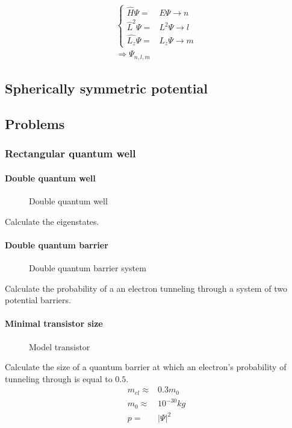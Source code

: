 	\begin{align}
		\left\{ \begin{aligned}
			\hat{H} \Psi =& E \Psi \rightarrow n\\
			\hat{L}^2 \Psi =& L^2 \Psi \rightarrow l \\
			\hat{L_z} \Psi =& L_z \Psi  \rightarrow m
		\end{aligned} \right. \\
		\Rightarrow \Psi_{n,l,m}
	\end{align}
	\subsection{Spherically symmetric potential}
	\newpage
	\subsection{Problems}
		\subsubsection{Rectangular quantum well}
			\paragraph{Double quantum well}
				\begin{figure}[!h]
					\centering
					
					\caption{Double quantum well}
				\end{figure}
				
				Calculate the eigenstates.
			\paragraph{Double quantum barrier}
				\begin{figure}[!h]
					\centering
					
					\caption{Double quantum barrier system}
				\end{figure}
				
				Calculate the probability of a an electron tunneling through a system of two potential barriers.			
			\paragraph{Minimal transistor size}
				\begin{figure}[!h]
					\centering
					
					\caption{Model transistor}
				\end{figure}
							
				Calculate the size of a quantum barrier at which an electron's probability of tunneling through is equal to $0.5$.
				\begin{align}
					m_{el} \approx& 0.3 m_0 \\
					m_0 \approx& 10^{-30}\si{kg} \\
					p =& |\Psi|^2
				\end{align}
			